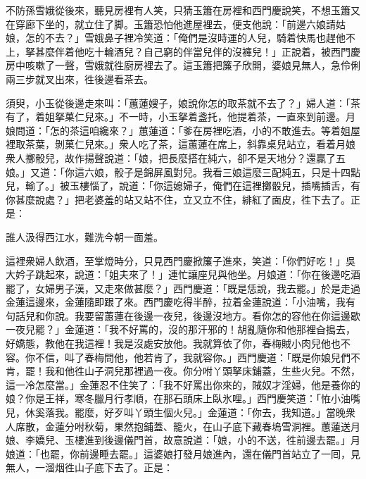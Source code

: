 不防孫雪娥從後來，聽見房裡有人笑，只猜玉簫在房裡和西門慶說笑，不想玉簫又在穿廊下坐的，就立住了脚。玉簫恐怕他進屋裡去，便支他說：「前邊六娘請姑娘，怎的不去？」雪娥鼻子裡冷笑道：{}「俺們是沒時運的人兒，{}騎着快馬也趕他不上，拏甚麼伴着他吃十輪酒兒？自己窮的伴當兒伴的沒褲兒！」正說着，被西門慶房中咳嗽了一聲，雪娥就徃廚房裡去了。這玉簫把簾子欣開，婆娘見無人，急伶俐兩三步就叉出來，{}徃後邊看茶去。

須臾，小玉從後邊走來叫：「蕙蓮嫂子，娘說你怎的取茶就不去了？」婦人道：「茶有了，着姐拏菓仁兒來。」不一時，小玉拏着盞托，他提着茶，一直來到前邊。月娘問道：「怎的茶這咱纔來？」蕙蓮道：「爹在房裡吃酒，小的不敢進去。{}等着姐屋裡取茶葉，剝菓仁兒來。」衆人吃了茶，這蕙蓮在席上，斜靠桌兒站立，看着月娘衆人擲骰兒，故作揚聲說道：「娘，把長麼搭在純六，卻不是天地分？還贏了五娘。」又道：「你這六娘，骰子是錦屏風對兒。我看三娘這麼三配純五，只是十四點兒，輸了。」被玉樓惱了，說道：「你這媳婦子，俺們在這裡擲骰兒，插嘴插舌，有你甚麼說處？」把老婆羞的站又站不住，立又立不住，緋紅了面皮，徃下去了。{}正是：

\begin{myquote} 
誰人汲得西江水，難洗今朝一面羞。
\end{myquote} 

這裡衆婦人飲酒，至掌燈時分，只見西門慶掀簾子進來，笑道：「你們好吃！」吳大妗子跳起來，說道：「姐夫來了！」連忙讓座兒與他坐。月娘道：「你在後邊吃酒罷了，女婦男子漢，又走來做甚麼？」西門慶道：「既是恁說，我去罷。」於是走過金蓮這邊來，金蓮隨即跟了來。西門慶吃得半醉，拉着金蓮說道：「小油嘴，我有句話兒和你說。我要留蕙蓮在後邊一夜兒，後邊沒地方。看你怎的容他在你這邊歇一夜兒罷？」金蓮道：「我不好罵的，沒的那汗邪的！胡亂隨你和他那裡㒲搗去，好嬌態，教他在我這裡！我是沒處安放他。我就算依了你，春梅賊小肉兒他也不容。{}你不信，叫了春梅問他，他若肯了，我就容你。」西門慶道：「既是你娘兒們不肯，罷！我和他徃山子洞兒那裡過一夜。你分咐丫頭拏床鋪蓋，生些火兒。不然，這一冷怎麼當。」金蓮忍不住笑了：「我不好罵出你來的，賊奴才淫婦，他是養你的娘？你是王祥，寒冬臘月行孝順，在那石頭床上臥氷哩。」{}西門慶笑道：「恠小油嘴兒，休奚落我。罷麼，好歹叫丫頭生個火兒。」金蓮道：「你去，我知道。」當晚衆人席散，金蓮分咐秋菊，果然抱鋪蓋、籠火，在山子底下藏春塢雪洞裡。蕙蓮送月娘、李嬌兒、玉樓進到後邊儀門首，故意說道：「娘，小的不送，徃前邊去罷。」月娘道：「也罷，你前邊睡去罷。」這婆娘打發月娘進內，還在儀門首站立了一囘，見無人，{}一溜烟徃山子底下去了。正是：

